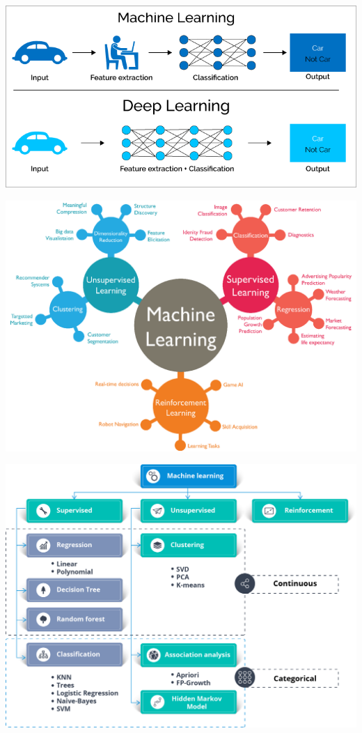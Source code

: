 \documentclass[
]{book}
\begin{document}
\includegraphics{images/T3-MLvsDL.png}

\includegraphics{images/T3-machinelearning.png}

\includegraphics{images/T3-machinelearningalgorithms.png}
\end{document}
